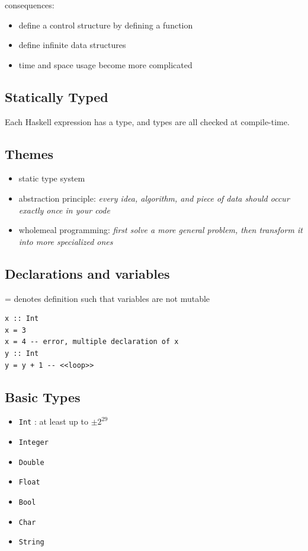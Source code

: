 \documentclass{blog}
\begin{document}
consequences:
\begin{itemize}
    \item define a control structure by defining a function
    \item define infinite data structures
    \item time and space usage become more complicated
\end{itemize}

\subsection{Statically Typed}
\begin{definition}
    Each Haskell expression has a type, and types are all checked at compile-time.
\end{definition}

\subsection{Themes}
\begin{itemize}
    \item static type system
    \item abstraction principle:
          \textit{every idea, algorithm, and piece of data should occur exactly once in your code}
    \item wholemeal programming:
          \textit{first solve a more general problem, then transform it into more specialized ones}
\end{itemize}

\subsection{Declarations and variables}
\begin{definition}[=]
    = denotes definition such that variables are not mutable
\end{definition}

\begin{example}
    \begin{verbatim}
x :: Int
x = 3
x = 4 -- error, multiple declaration of x
y :: Int
y = y + 1 -- <<loop>>
\end{verbatim}
\end{example}

\subsection{Basic Types}
\begin{itemize}
    \item \verb|Int| : at least up to $\pm 2^{29}$
    \item \verb|Integer|
    \item \verb|Double|
    \item \verb|Float|
    \item \verb|Bool|
    \item \verb|Char|
    \item \verb|String|
\end{itemize}
\end{document}
